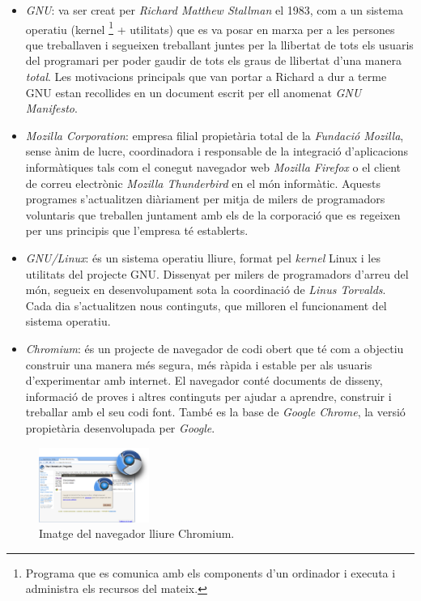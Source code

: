 \begin{itemize}

\item \emph{GNU}: va ser creat per \emph{Richard Matthew Stallman} el 1983, com a un sistema operatiu (kernel \footnote{Programa que es comunica amb els components d'un ordinador i executa i administra els recursos del mateix.} + utilitats) que es va posar en marxa per a les persones que treballaven i segueixen treballant juntes per la llibertat de tots els usuaris del programari per poder gaudir de tots els graus de llibertat d'una manera \emph{total}. Les motivacions principals que van portar a Richard a dur a terme GNU estan recollides en un document escrit per ell anomenat \emph{GNU Manifesto}. \cite{GNUExit} \cite{GNUExitII} \cite{GnuMan} \cite{GvsM}

\item \emph{Mozilla Corporation}: empresa filial propietària total de la \emph{Fundació Mozilla}, sense ànim de lucre, coordinadora i responsable de la integració d'aplicacions informàtiques tals com el conegut navegador web \emph{Mozilla Firefox} o el client de correu electrònic \emph{Mozilla Thunderbird} en el món informàtic. Aquests programes s'actualitzen diàriament per mitja de milers de programadors voluntaris que treballen juntament amb els de la corporació que es regeixen per uns principis que l'empresa té establerts. \cite{MozExit} \cite{MozExitII} \cite{MozFesto}

\item \emph{GNU/Linux}: és un sistema operatiu lliure, format pel \emph{kernel} Linux i les utilitats del projecte GNU. Dissenyat per milers de programadors d'arreu del món, segueix en desenvolupament sota la coordinació de \emph{Linus Torvalds}. Cada dia s'actualitzen nous continguts, que milloren el funcionament del sistema operatiu. \cite{LinExit} \cite{POSIX}

\item \emph{Chromium}: és un projecte de navegador de codi obert que té com a objectiu construir una manera més segura, més ràpida i estable per als usuaris d'experimentar amb internet. El navegador conté documents de disseny, informació de proves i altres continguts per ajudar a aprendre, construir i treballar amb el seu codi font. També es la base de \emph{Google Chrome}, la versió propietària desenvolupada per \emph{Google}. \cite{Chrom} 
\end{itemize}

\begin{figure}[ht!]
\centering
\includegraphics[width=36mm]{data/chromium.png}
\caption{Imatge del navegador lliure Chromium.}
\label{chromium}
\end{figure}
